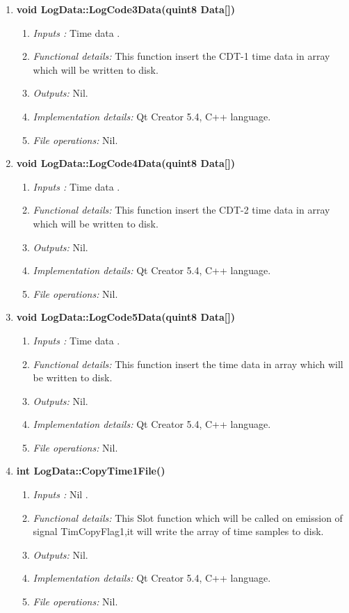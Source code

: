\begin{enumerate}
\begin{enumerate}
	\item  \textbf{void LogData::LogCode3Data(quint8 Data[])}
	\begin{enumerate}
		\item \textit{Inputs :} Time data .
		\item \textit{Functional details:} This function insert the CDT-1 time data in array which will be written to disk.
		\item \textit{Outputs:} Nil.
		\item \textit{Implementation details:} Qt Creator 5.4, C++ language.
		\item \textit{File operations:} Nil.
	\end{enumerate}
	
	\item  \textbf{void LogData::LogCode4Data(quint8 Data[])}
	\begin{enumerate}
		\item \textit{Inputs :} Time data .
		\item \textit{Functional details:} This function insert the CDT-2 time data in array which will be written to disk.
		\item \textit{Outputs:} Nil.
		\item \textit{Implementation details:} Qt Creator 5.4, C++ language.
		\item \textit{File operations:} Nil.
	\end{enumerate}
	
	\item  \textbf{void LogData::LogCode5Data(quint8 Data[])}
	\begin{enumerate}
		\item \textit{Inputs :} Time data .
		\item \textit{Functional details:} This function insert the time data in array which will be written to disk.
		\item \textit{Outputs:} Nil.
		\item \textit{Implementation details:} Qt Creator 5.4, C++ language.
		\item \textit{File operations:} Nil.
	\end{enumerate}
	
	
	\item  \textbf{int LogData::CopyTime1File()}
	\begin{enumerate}
		\item \textit{Inputs :} Nil .
		\item \textit{Functional details:} This Slot function which will be called on emission of signal TimCopyFlag1,it will write the array of time samples to disk.
		\item \textit{Outputs:} Nil.
		\item \textit{Implementation details:} Qt Creator 5.4, C++ language.
		\item \textit{File operations:} Nil.
	\end{enumerate}
	

\end{enumerate}
\end{enumerate}
